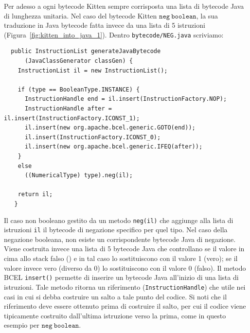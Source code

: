 Per adesso a ogni bytecode Kitten \e sempre corrisposta una lista di bytecode Java di lunghezza unitaria.
Nel caso del bytecode Kitten $\mathtt{neg\ boolean}$, la sua traduzione in Java bytecode
\e fatta invece da una lista di 5 istruzioni (Figura~\ref{fig:kitten_into_java_1}). Dentro
\texttt{bytecode/NEG.java} scriviamo:
%
\begin{verbatim}
  public InstructionList generateJavaBytecode
      (JavaClassGenerator classGen) {
    InstructionList il = new InstructionList();

    if (type == BooleanType.INSTANCE) {
      InstructionHandle end = il.insert(InstructionFactory.NOP);
      InstructionHandle after = il.insert(InstructionFactory.ICONST_1);
      il.insert(new org.apache.bcel.generic.GOTO(end));
      il.insert(InstructionFactory.ICONST_0);
      il.insert(new org.apache.bcel.generic.IFEQ(after));
    }
    else
      ((NumericalType) type).neg(il);
    
    return il;
   }
\end{verbatim}
%
Il caso non booleano \e gestito da un metodo \texttt{neg(il)} che aggiunge alla
lista di istruzioni \texttt{il} il bytecode di negazione specifico per quel tipo.
Nel caso della negazione booleana, non esiste un corrispondente bytecode Java di negazione.
Viene costruita invece una lista di 5 bytecode Java che
controllano se il valore in cima allo stack \e falso () e in tal caso
lo sostituiscono con il valore 1 (\cioe vero); se il valore \e invece vero (diverso da 0)
lo sostituiscono con il valore 0 (\cioe falso). Il metodo BCEL \texttt{insert()}
permette di inserire un bytecode Java all'inizio di una lista di istruzioni.
Tale metodo ritorna un riferimento (\texttt{InstructionHandle}) che \e utile nei casi
in cui si debba costruire un salto a tale punto del codice. Si noti che il riferimento deve
essere ottenuto prima di costruire il salto, per cui il codice viene tipicamente
costruito dall'ultima istruzione verso la prima, come in questo esempio
per $\mathtt{neg\ boolean}$.

